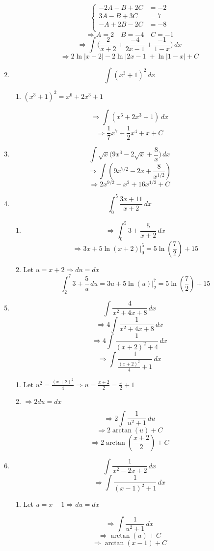 \documentclass[12pt]{article}
\begin{document}
\begin{enumerate}
\[   \left\{
\begin{array}{lll}
    -2A-B+2C &=-2 \\
    3A-B+3C &=7 \\
    -A+2B-2C&=-8 \\
\end{array} 
\right. \]
$$\Longrightarrow A=2 \quad  B=-4 \quad C=-1$$
$$\Longrightarrow \int \bigg( \frac{2}{x+2} + \frac{-4}{2x-1} +\frac{-1}{1-x} \bigg) \, dx$$
$$\Longrightarrow 2\ln|x+2|-2\ln|2x-1|+\ln|1-x| +C$$
\item $$\int (x^3+1)^2 \, dx$$
\begin{enumerate}
    \item $(x^3+1)^2 = x^6+2x^3+1$
\end{enumerate}
$$\Longrightarrow \int (x^6+2x^3+1) \, dx$$
$$\Longrightarrow \frac{1}{7}x^7 +\frac{1}{2}x^4 +x +C$$

\item $$\int \sqrt{x} \bigg(9x^3-2\sqrt{x}+\frac{8}{x}\bigg) \, dx$$
$$\Longrightarrow \int (9x^{7/2}-2x+\frac{8}{x^{1/2}})$$
$$\Longrightarrow 2x^{9/2} -x^2 +16x^{1/2} +C$$

\item $$\int_{0}^{5} \frac{3x+11}{x+2} \, dx$$
\begin{enumerate}
    \item {} $$\Longrightarrow \int_{0}^{5} 3+ \frac{5}{x+2} \, dx$$
    $$\Longrightarrow 3x+5\ln(x+2)\bigg\rvert_{0}^{5} =5\ln(\frac{7}{2})+15$$
    \item Let $u=x+2 \Longrightarrow du = dx$
    $$ \int_{2}^{7} 3 + \frac{5}{u} \, du = 3u +5\ln(u) \bigg\rvert_{2}^{7} = 5\ln(\frac{7}{2})+15  $$
\end{enumerate}


\item $$\int \frac{4}{x^2+4x+8} \, dx$$
$$\Longrightarrow 4\int \frac{1}{x^2+4x+8} \, dx$$
$$\Longrightarrow 4\int \frac{1}{(x+2)^2 + 4} \, dx$$
$$\Longrightarrow \int \frac{1}{\frac{(x+2)^2}{4} + 1} \, dx$$
\begin{enumerate}
    \item Let $u^2=\frac{(x+2)^2}{4} \Longrightarrow u= \frac{x+2}{2}= \frac{x}{2}+1$
    \item $\Longrightarrow 2du=dx$
\end{enumerate}
$$\Longrightarrow 2\int \frac{1}{u^2+1} \, du$$
$$\Longrightarrow 2\arctan (u) + C$$
$$\Longrightarrow 2\arctan (\frac{x+2}{2}) + C$$

\item $$\int \frac{1}{x^2-2x+2} \, dx$$
$$\Longrightarrow \int \frac{1}{(x-1)^2+1} \, dx$$
\begin{enumerate}
    \item Let $u=x-1 \Longrightarrow du=dx$
\end{enumerate}
$$\Longrightarrow  \int \frac{1}{u^2+1} \, dx$$
$$\Longrightarrow  \arctan(u) + C$$
$$\Longrightarrow  \arctan(x-1) + C$$


\end{enumerate}
\end{document}
